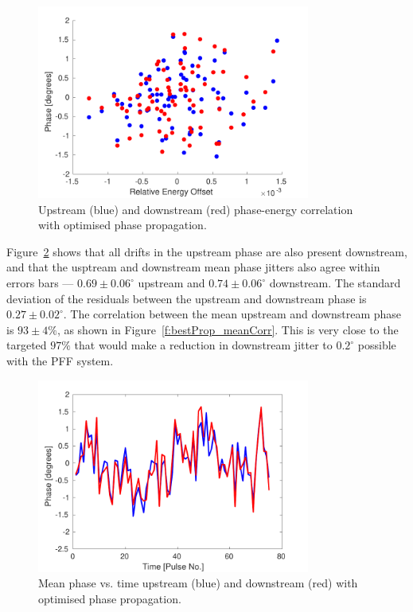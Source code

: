 \begin{figure}
  \centering
  \includegraphics[width=0.8\textwidth]{Figures/propagation/bestProp_enCorr}
  \caption{Upstream (blue) and downstream (red) phase-energy correlation with optimised phase propagation.}
  \label{f:bestProp_enCorr}
\end{figure}

Figure~\ref{f:bestProp_meanPhase} shows that all drifts in the upstream phase are also present downstream, and that the usptream and downstream mean phase jitters also agree within errors bars --- \(0.69\pm0.06^\circ\) upstream and \(0.74\pm0.06^\circ\) downstream. The standard deviation of the residuals between the upstream and downstream phase is \(0.27\pm0.02^\circ\).%
The correlation between the mean upstream and downstream phase is \(93\pm4\%\), as shown in Figure~\ref{f:bestProp_meanCorr}. This is very close to the targeted \(97\%\) that would make a reduction in downstream jitter to \(0.2^\circ\) possible with the PFF system.

\begin{figure}
  \centering
  \includegraphics[width=0.8\textwidth]{Figures/propagation/bestProp_meanPhase}
  \caption{Mean phase vs. time upstream (blue) and downstream (red) with optimised phase propagation.}
  \label{f:bestProp_meanPhase}
\end{figure}

